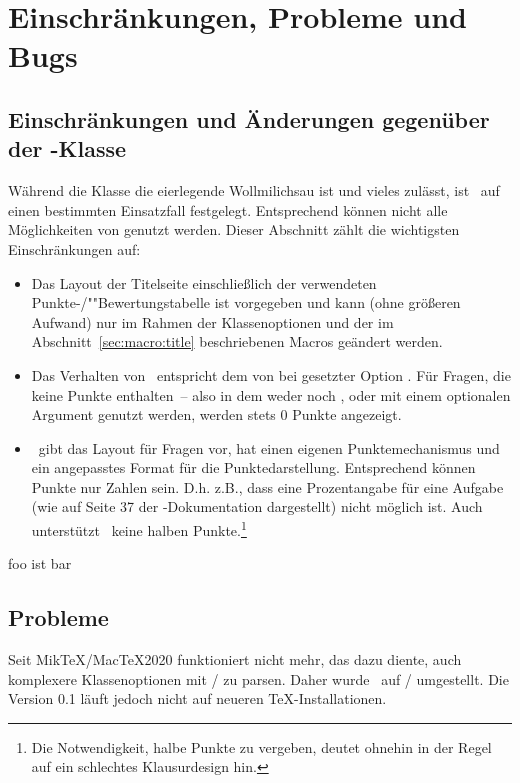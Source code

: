 \documentclass[
load=osgexam,
babel=ngerman
]{skdoc}
\begin{document}
\section{Einschränkungen, Probleme und Bugs}
\subsection{Einschränkungen und Änderungen gegenüber der -Klasse}
Während die Klasse  die eierlegende Wollmilichsau ist und vieles zulässt, ist \thepkg\ auf einen bestimmten
Einsatzfall festgelegt. Entsprechend können nicht alle Möglichkeiten von  genutzt werden.
Dieser Abschnitt zählt die wichtigsten Einschränkungen auf:
\begin{itemize}
   \item Das Layout der Titelseite einschließlich der verwendeten \mbox{Punkte-/}""Bewertungstabelle ist vorgegeben und kann (ohne größeren
    Aufwand) nur im Rahmen der Klassenoptionen und der im Abschnitt~\ref{sec:macro:title} beschriebenen Macros geändert werden.
 
    
  \item Das Verhalten von \thepkg\ entspricht dem von  bei gesetzter Option . Für Fragen, die keine
    Punkte enthalten~-- also in dem weder  noch ,  oder 
    mit einem optionalen Argument genutzt werden, werden stets 0 Punkte angezeigt.
    
  \item \thepkg\ gibt das Layout für Fragen vor, hat einen eigenen Punktemechanismus und ein angepasstes Format für
    die Punktedarstellung. Entsprechend können Punkte nur Zahlen sein. D.\;h. z.\;B., dass eine Prozentangabe für eine
    Aufgabe (wie  auf  Seite 37 der -Dokumentation dargestellt) nicht möglich ist. Auch unterstützt \thepkg\
    keine halben Punkte.\footnote{Die Notwendigkeit, halbe Punkte zu vergeben, deutet ohnehin in der Regel auf ein
      schlechtes Klausurdesign hin.}
\end{itemize}

 foo ist bar
\subsection{Probleme}
Seit Mik\TeX/Mac\TeX 2020 funktioniert  nicht mehr, das dazu diente, auch komplexere Klassenoptionen
mit \pkg{keyval}/\pkg{kvoptions} zu parsen. Daher wurde \thepkg\ auf \pkg{pgfkeys}/\pkg{pgfopts} umgestellt. Die Version
0.1 läuft jedoch nicht auf neueren \TeX-Installationen.
\end{document}
